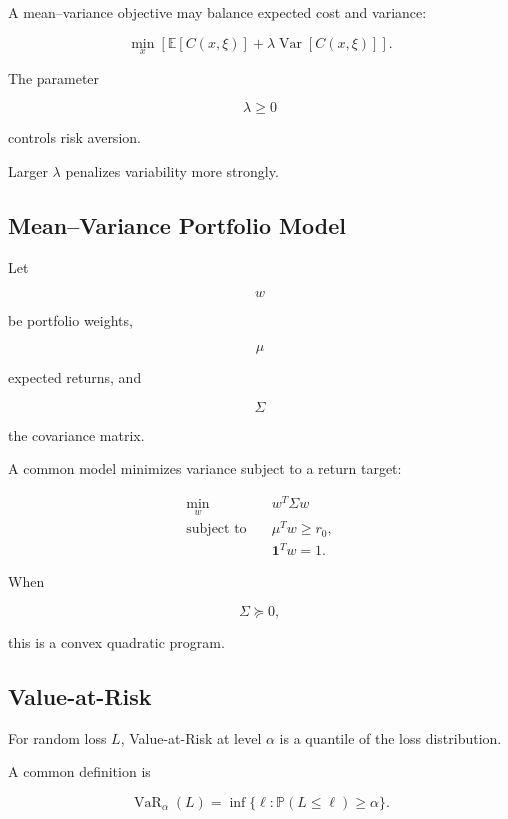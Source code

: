 A mean--variance objective may balance expected cost and variance:

\[
\boxed{
\min_x
\left[
\mathbb{E}
[
C(x,\xi)
]
+
\lambda
\operatorname{Var}
[
C(x,\xi)
]
\right].
}
\]

The parameter

\[
\lambda\geq0
\]

controls risk aversion.

Larger \(\lambda\) penalizes variability more strongly.

\subsection{Mean--Variance Portfolio Model}
\label{subsec:mean-variance-portfolio}

Let

\[
w
\]

be portfolio weights,

\[
\mu
\]

expected returns, and

\[
\Sigma
\]

the covariance matrix.

A common model minimizes variance subject to a return target:

\[
\boxed{
\begin{aligned}
\min_w
\quad&
w^T\Sigma w
\\
\text{subject to}
\quad&
\mu^Tw
\geq
r_0,
\\
&
\mathbf{1}^Tw=1.
\end{aligned}
}
\]

When

\[
\Sigma\succeq0,
\]

this is a convex quadratic program.

\subsection{Value-at-Risk}
\label{subsec:value-at-risk}

For random loss \(L\), Value-at-Risk at level \(\alpha\) is a quantile of
the loss distribution.

A common definition is

\[
\boxed{
\operatorname{VaR}_{\alpha}(L)
=
\inf
\{
\ell:
\mathbb{P}(L\leq\ell)
\geq\alpha
\}.
}
\]

